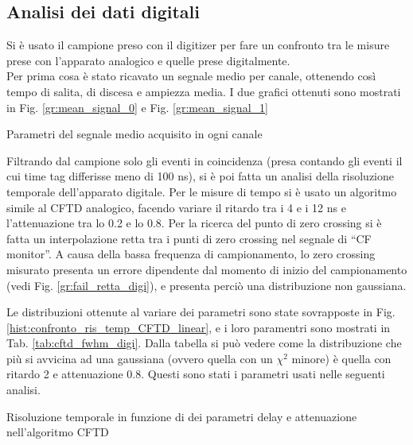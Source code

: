 \subsection{Analisi dei dati digitali}
Si è usato il campione preso con il digitizer per fare un confronto tra le misure prese con l'apparato analogico e quelle prese digitalmente.\\
Per prima cosa è stato ricavato un segnale medio per canale, ottenendo così tempo di salita, di discesa e ampiezza media. I due grafici ottenuti sono mostrati in Fig. \ref{gr:mean_signal_0} e Fig. \ref{gr:mean_signal_1}




\begin{table}[h]
	\centering
	
	\caption{Parametri del segnale medio acquisito in ogni canale}
	\label{tab:signal_shape}
\end{table}

Filtrando dal campione solo gli eventi in coincidenza (presa contando gli eventi il cui time tag differisse meno di 100 ns), si è poi fatta un analisi della risoluzione temporale dell'apparato digitale. Per le misure di tempo si è usato un algoritmo simile al CFTD analogico, facendo variare il ritardo tra i 4 e i 12 ns e l'attenuazione tra lo 0.2 e lo 0.8. Per la ricerca del punto di zero crossing si è fatta un interpolazione retta tra i punti di zero crossing nel segnale di ``CF monitor''. A causa della bassa frequenza di campionamento, lo zero crossing misurato presenta un errore dipendente dal momento di inizio del campionamento (vedi Fig. \ref{gr:fail_retta_digi}), e presenta perciò una distribuzione non gaussiana.



Le distribuzioni ottenute al variare dei parametri sono state sovrapposte in Fig. \ref{hist:confronto_ris_temp_CFTD_linear}, e i loro paramentri sono mostrati in Tab. \ref{tab:cftd_fwhm_digi}. Dalla tabella si può vedere come la distribuzione che più si avvicina ad una gaussiana (ovvero quella con un $\chi^2$ minore) è quella con ritardo 2 e attenuazione 0.8. Questi sono stati i parametri usati nelle seguenti analisi.



\begin{table}[h]
	\centering
	
	\caption{Risoluzione temporale in funzione di dei parametri delay e attenuazione nell'algoritmo CFTD}
	\label{tab:cftd_fwhm_digi}
\end{table}

